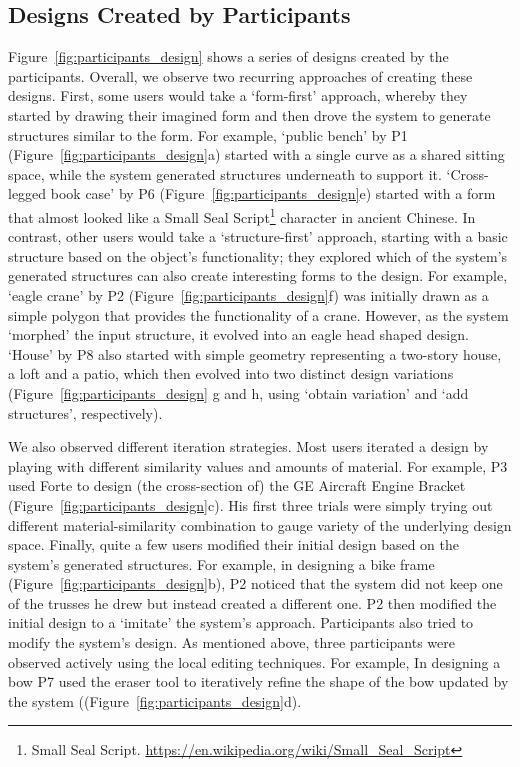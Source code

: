 \subsection{Designs Created by Participants}
Figure~\ref{fig:participants_design} shows a series of designs created by the participants. Overall, we observe two recurring approaches of creating these designs. First, some users would take a `form-first' approach, whereby they started by drawing their imagined form and then drove the system to generate structures similar to the form. For example, `public bench' by P1 (Figure~\ref{fig:participants_design}a) started with a single curve as a shared sitting space, while the system generated structures underneath to support it. `Cross-legged book case' by P6 (Figure~\ref{fig:participants_design}e) started with a form that almost looked like a Small Seal Script\footnote{Small Seal Script. \url{https://en.wikipedia.org/wiki/Small_Seal_Script}} character in ancient Chinese. In contrast, other users would take a `structure-first' approach, starting with a basic structure based on the object's functionality; they explored which of the system's generated structures can also create interesting forms to the design. For example, `eagle crane' by P2 (Figure~\ref{fig:participants_design}f) was initially drawn as a simple polygon that provides the functionality of a crane. However, as the system `morphed' the input structure, it evolved into an eagle head shaped design. `House' by P8 also started with simple geometry representing a two-story house, a loft and a patio, which then evolved into two distinct design variations (Figure~\ref{fig:participants_design} g and h, using `obtain variation' and `add structures', respectively).


We also observed different iteration strategies. Most users iterated a design by playing with different similarity values and amounts of material. For example, P3 used Forte to design (the cross-section of) the GE Aircraft Engine Bracket (Figure~\ref{fig:participants_design}c). His first three trials were simply trying out different material-similarity combination to gauge variety of the underlying design space. 
Finally, quite a few users modified their initial design based on the system's generated structures. For example, in designing a bike frame (Figure~\ref{fig:participants_design}b), P2 noticed that the system did not keep one of the trusses he drew but instead created a different one. P2 then modified the initial design to a `imitate' the system's approach. Participants also tried to modify the system's design. As mentioned above, three participants were observed actively using the local editing techniques. For example, In designing a bow P7 used the eraser tool to iteratively refine the shape of the bow updated by the system ((Figure~\ref{fig:participants_design}d).

